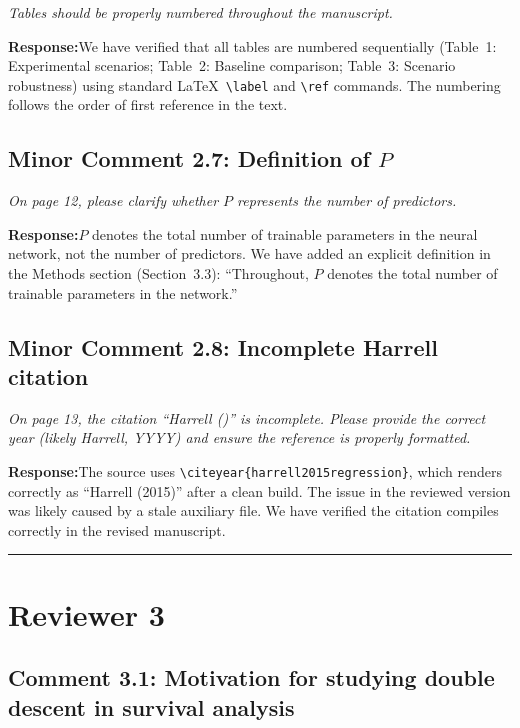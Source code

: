 \documentclass[12pt,a4paper]{article}
\newcommand{\comment}[1]{%
  \begin{reviewerbox}
    \textit{#1}
  \end{reviewerbox}
}
\newcommand{\response}{\noindent\textbf{Response:}\quad}
\begin{document}
\comment{Tables should be properly numbered throughout the manuscript.}

\response We have verified that all tables are numbered sequentially
(Table~1: Experimental scenarios; Table~2: Baseline comparison; Table~3:
Scenario robustness) using standard \LaTeX\ \texttt{\textbackslash label}
and \texttt{\textbackslash ref} commands. The numbering follows the order of
first reference in the text.


\bigskip

\subsection*{Minor Comment 2.7: Definition of $P$}

\comment{On page 12, please clarify whether $P$ represents the number of predictors.}

\response $P$ denotes the total number of trainable parameters in the neural
network, not the number of predictors. We have added an explicit definition
in the Methods section (Section~3.3): ``Throughout, $P$ denotes the total
number of trainable parameters in the network.''


\bigskip

\subsection*{Minor Comment 2.8: Incomplete Harrell citation}

\comment{On page 13, the citation ``Harrell ()'' is incomplete. Please provide the correct year (likely Harrell, YYYY) and ensure the reference is properly formatted.}

\response The source uses \texttt{\textbackslash citeyear\{harrell2015regression\}},
which renders correctly as ``Harrell (2015)'' after a clean build. The issue
in the reviewed version was likely caused by a stale auxiliary file. We have
verified the citation compiles correctly in the revised manuscript.


\bigskip
\hrule
\bigskip

\section*{Reviewer 3}

\subsection*{Comment 3.1: Motivation for studying double descent in survival analysis}
\end{document}

